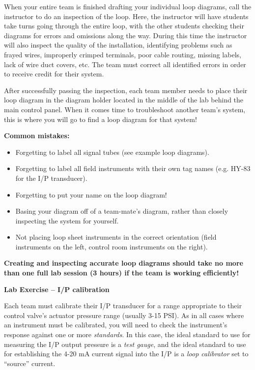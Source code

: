 \begin{itemize}
When your entire team is finished drafting your individual loop diagrams, call the instructor to do an inspection of the loop.  Here, the instructor will have students take turns going through the entire loop, with the other students checking their diagrams for errors and omissions along the way.  During this time the instructor will also inspect the quality of the installation, identifying problems such as frayed wires, improperly crimped terminals, poor cable routing, missing labels, lack of wire duct covers, etc.  The team must correct all identified errors in order to receive credit for their system.  

After successfully passing the inspection, each team member needs to place their loop diagram in the diagram holder located in the middle of the lab behind the main control panel.  When it comes time to troubleshoot another team's system, this is where you will go to find a loop diagram for that system!

\vskip 10pt

{\bf Common mistakes:}

\begin{itemize}
\item{} Forgetting to label all signal tubes (see example loop diagrams).
\item{} Forgetting to label all field instruments with their own tag names (e.g. HY-83 for the I/P transducer).
\item{} Forgetting to put your name on the loop diagram!
\item{} Basing your diagram off of a team-mate's diagram, rather than closely inspecting the system for yourself.
\item{} Not placing loop sheet instruments in the correct orientation (field instruments on the left, control room instruments on the right).
\end{itemize}

\vskip 10pt

{\bf Creating and inspecting accurate loop diagrams should take no more than one full lab session (3 hours) if the team is working efficiently!}





\vfil \eject

\noindent
{\bf Lab Exercise -- I/P calibration}

\vskip 5pt

Each team must calibrate their I/P transducer for a range appropriate to their control valve's actuator pressure range (usually 3-15 PSI).  As in all cases where an instrument must be calibrated, you will need to check the instrument's response against one or more {\it standards}.  In this case, the ideal standard to use for measuring the I/P output pressure is a {\it test gauge}, and the ideal standard to use for establishing the 4-20 mA current signal into the I/P is a {\it loop calibrator} set to ``source'' current.


\end{itemize}
